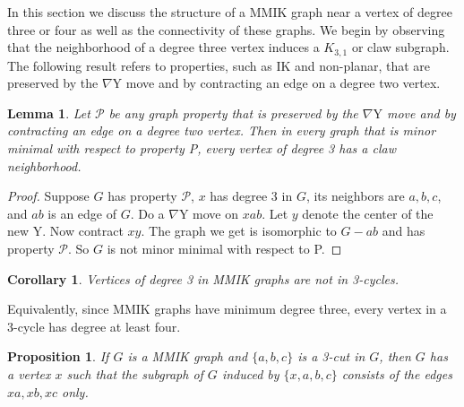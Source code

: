 \documentclass[10pt,a4paper]{amsart}
\newtheorem{lemma}[theorem]{Lemma}
\newtheorem{proposition}[theorem]{Proposition}
\newtheorem{corollary}[theorem]{Corollary}
\newcommand{\ty}{\nabla\mathrm{Y}}
\newcommand{\PP}{\mathcal P}
\begin{document}
In this section we discuss the structure of a MMIK graph near a vertex of degree three or four as well as the connectivity of these graphs.
We begin by observing that the neighborhood of a degree three vertex induces a $K_{3,1}$ or claw subgraph.
The following result refers to properties, such as IK and non-planar,
that are preserved by the $\ty$ move and by contracting an edge on a degree two vertex.

\begin{lemma}
\label{lem-mmikclaw}
Let $\PP$ be any graph property that is preserved by the $\ty$ move
and by contracting an edge on a degree two vertex.
Then in every graph that is minor minimal with respect to property P,
every vertex of degree 3 has a claw neighborhood.
\end{lemma}
\begin{proof}
Suppose $G$ has property $\PP$,
$x$ has degree 3 in $G$,
its neighbors are $a, b, c$,
and $ab$ is an edge of $G$.
Do a $\ty$ move on $xab$.
Let $y$ denote the center of the new Y.
Now contract $xy$.
The graph we get is isomorphic to $G - ab$
and has property $\PP$.
So $G$ is not minor minimal with respect to P.
\end{proof}

\begin{corollary}
\label{cor-mmikclaw}
Vertices of degree 3 in MMIK graphs
are not in 3-cycles.
\end{corollary}

Equivalently, since MMIK graphs have minimum degree three, every vertex in a 3-cycle has degree at least four.


\begin{proposition}
\label{prop-mmik3cut}
If $G$ is a MMIK graph and $\{a, b, c\}$ is a 3-cut in $G$,
then $G$ has a vertex $x$ such that
the subgraph of $G$ induced by $\{x,a,b,c\}$ consists of
the edges $xa, xb, xc$ only.
\end{proposition}
\end{document}

